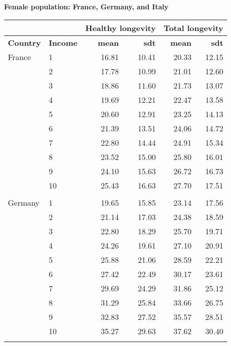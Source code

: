 \begin{table}
\centering \textbf{Female population: France, Germany, and Italy}\par\medskip\medskip
\begin{tabular}{llrrrr}
\toprule
& & \multicolumn{2}{l}{Healthy longevity} & \multicolumn{2}{l}{Total longevity} \\
\midrule
\textbf{Country }& \textbf{Income} &  \textbf{mean}       &  \textbf{sdt}     &     \textbf{mean}         & \textbf{sdt}    \\
\midrule
France & 1  &   16.81 &  10.41 &  20.33 &  12.15 \\
            & 2  &   17.78 &  10.99 &  21.01 &  12.60 \\
            & 3  &   18.86 &  11.60 &  21.73 &  13.07 \\
            & 4  &   19.69 &  12.21 &  22.47 &  13.58 \\
            & 5  &   20.60 &  12.91 &  23.25 &  14.13 \\
            & 6  &   21.39 &  13.51 &  24.06 &  14.72 \\
            & 7  &   22.80 &  14.44 &  24.91 &  15.34 \\
            & 8  &   23.52 &  15.00 &  25.80 &  16.01 \\
            & 9  &   24.10 &  15.63 &  26.72 &  16.73 \\
            & 10 &   25.43 &  16.63 &  27.70 &  17.51 \\
                     & &    &   &   &  \\
Germany & 1  &   19.65 &  15.85 &  23.14 &  17.56 \\
            & 2  &   21.14 &  17.03 &  24.38 &  18.59 \\
            & 3  &   22.80 &  18.29 &  25.70 &  19.71 \\
            & 4  &   24.26 &  19.61 &  27.10 &  20.91 \\
            & 5  &   25.88 &  21.06 &  28.59 &  22.21 \\
            & 6  &   27.42 &  22.49 &  30.17 &  23.61 \\
            & 7  &   29.69 &  24.29 &  31.86 &  25.12 \\
            & 8  &   31.29 &  25.84 &  33.66 &  26.75 \\
            & 9  &   32.83 &  27.52 &  35.57 &  28.51 \\
            & 10 &   35.27 &  29.63 &  37.62 &  30.40 \\
                     & &    &   &   &  \\

\end{tabular}
\end{table}
